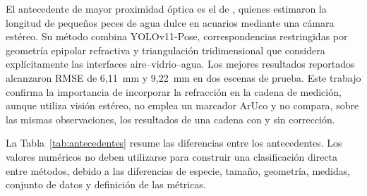 \documentclass{report}
\begin{document}
El antecedente de mayor proximidad óptica es el de \textcite{Seibold2026}, quienes estimaron la longitud de pequeños peces de agua dulce en acuarios mediante una cámara estéreo. Su método combina YOLOv11-Pose, correspondencias restringidas por geometría epipolar refractiva y triangulación tridimensional que considera explícitamente las interfaces aire--vidrio--agua. Los mejores resultados reportados alcanzaron RMSE de 6,11~mm y 9,22~mm en dos escenas de prueba. Este trabajo confirma la importancia de incorporar la refracción en la cadena de medición, aunque utiliza visión estéreo, no emplea un marcador ArUco y no compara, sobre las mismas observaciones, los resultados de una cadena con y sin corrección.

La Tabla~\ref{tab:antecedentes} resume las diferencias entre los antecedentes. Los valores numéricos no deben utilizarse para construir una clasificación directa entre métodos, debido a las diferencias de especie, tamaño, geometría, medidas, conjunto de datos y definición de las métricas.
\end{document}
